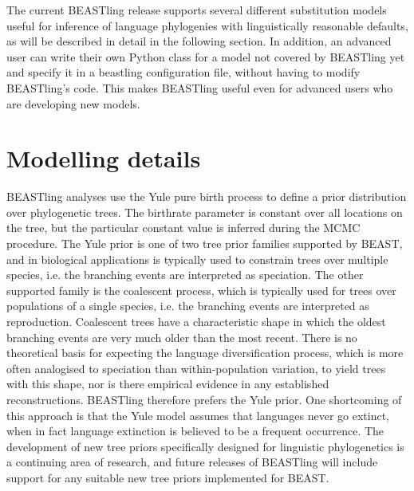 \documentclass[10pt,a4paper]{article}
\begin{document}
The current BEASTling release supports several different substitution models useful for inference of language phylogenies with linguistically reasonable defaults, as will be described in detail in the following section. In addition, an advanced user can write their own Python class for a model not covered by BEASTling yet and specify it in a beastling configuration file, without having to modify BEASTling's code.  This makes BEASTling useful even for advanced users who are developing new models.

\section{Modelling details}

BEASTling analyses use the Yule pure birth process\cite{Yule1924} to define a prior distribution over phylogenetic trees.  The birthrate parameter is constant over all locations on the tree, but the particular constant value is inferred during the MCMC procedure.  The Yule prior is one of two tree prior families supported by BEAST, and in biological applications is typically used to constrain trees over multiple species, i.e. the branching events are interpreted as speciation.  The other supported family is the coalescent process\cite{Kingman1982}, which is typically used for trees over populations of a single species, i.e. the branching events are interpreted as reproduction.  Coalescent trees have a characteristic shape in which the oldest branching events are very much older than the most recent.  There is no theoretical basis for expecting the language diversification process, which is more often analogised to speciation than within-population variation, to yield trees with this shape, nor is there empirical evidence in any established reconstructions.  BEASTling therefore prefers the Yule prior.  One shortcoming of this approach is that the Yule model assumes that languages never go extinct, when in fact language extinction is believed to be a frequent occurrence.  The development of new tree priors specifically designed for linguistic phylogenetics is a continuing area of research, and future releases of BEASTling will include support for any suitable new tree priors implemented for BEAST.
\end{document}
